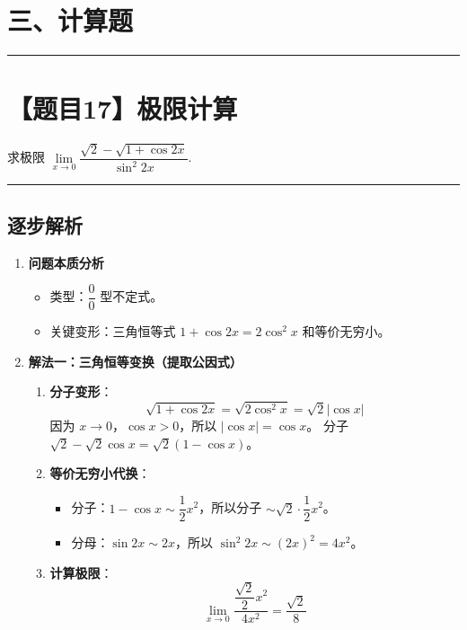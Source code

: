 \documentclass[UTF8,10pt]{ctexart}
\newenvironment{redenv}{\color{red}}{}
\newenvironment{detailedanalysis}{%
    \color{red}
    \begin{enumerate}[label=\textbf{第\arabic*步：}, leftmargin=*, align=left, itemsep=0pt, parsep=0pt, topsep=0pt, partopsep=0pt]
}{%
    \end{enumerate}
}
\newcommand{\problemrule}{\par\filbreak\noindent\rule{\textwidth}{1.5pt}\vspace{-0.5em}}
\newcommand{\analysisrule}{\noindent\rule{\textwidth}{0.8pt}\vspace{-0.5em}}
\begin{document}
\newpage
\section*{三、计算题}

\problemrule
\section*{【题目17】极限计算}
求极限 $\lim\limits_{x \to 0} \dfrac{\sqrt{2} - \sqrt{1 + \cos 2x}}{\sin^2 2x}$.

\begin{redenv}
\analysisrule
\subsection*{逐步解析}

\begin{detailedanalysis}
\item \textbf{问题本质分析}
\begin{itemize}
    \item 类型：$\dfrac{0}{0}$ 型不定式。
    \item 关键变形：三角恒等式 $1+\cos 2x = 2\cos^2 x$ 和等价无穷小。
\end{itemize}

\item \textbf{解法一：三角恒等变换（提取公因式）}
\begin{enumerate}[label=(\alph*)]
    \item \textbf{分子变形}：
    \[ \sqrt{1+\cos 2x} = \sqrt{2\cos^2 x} = \sqrt{2}|\cos x| \]
    因为 $x \to 0$，$\cos x > 0$，所以 $|\cos x| = \cos x$。
    分子 $\sqrt{2} - \sqrt{2}\cos x = \sqrt{2}(1 - \cos x)$。
    \item \textbf{等价无穷小代换}：
    \begin{itemize}
        \item 分子：$1 - \cos x \sim \dfrac{1}{2}x^2$，所以分子 $\sim \sqrt{2} \cdot \dfrac{1}{2}x^2$。
        \item 分母：$\sin 2x \sim 2x$，所以 $\sin^2 2x \sim (2x)^2 = 4x^2$。
    \end{itemize}
    \item \textbf{计算极限}：
    \[ \lim\limits_{x \to 0} \dfrac{\dfrac{\sqrt{2}}{2}x^2}{4x^2} = \dfrac{\sqrt{2}}{8} \]
\end{enumerate}


\end{detailedanalysis}
\end{redenv}
\end{document}
